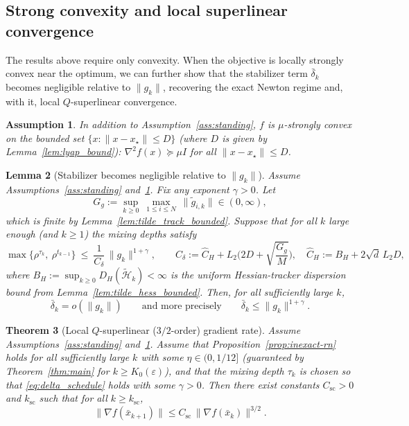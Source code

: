 \documentclass[11pt,a4paper]{article}
\newtheorem{theorem}{Theorem}[section]
\newtheorem{lemma}[theorem]{Lemma}
\newtheorem{assumption}[theorem]{Assumption}
\begin{document}
\subsection{Strong convexity and local superlinear convergence}
The results above require only convexity.
When the objective is locally strongly convex near the optimum,
we can further show that the stabilizer term $\bar\delta_k$ becomes
negligible relative to $\|g_k\|$, recovering the exact Newton
regime and, with it, local $Q$-superlinear convergence.

\begin{assumption}\label{ass:strong}
In addition to Assumption~\ref{ass:standing}, $f$ is $\mu$-strongly convex on the bounded set
$\{x:\|x-x_\star\|\le D\}$ (where $D$ is given by Lemma~\ref{lem:lyap_bound}):
$\nabla^2 f(x)\succeq \mu I$ for all $\|x-x_\star\|\le D$.
\end{assumption}

\begin{lemma}[Stabilizer becomes negligible relative to $\|g_k\|$]\label{lem:delta_o_g}
Assume Assumptions~\ref{ass:standing} and~\ref{ass:strong}.
Fix any exponent $\gamma>0$.
Let
\[
G_g:=\sup_{k\ge 0}\ \max_{1\le i\le N}\ \|\tilde g_{i,k}\|\in(0,\infty),
\]
which is finite by Lemma~\ref{lem:tilde_track_bounded}.
Suppose that for all $k$ large enough (and $k\ge 1$) the mixing depths satisfy
\begin{equation}\label{eq:delta_schedule}
\max\{\rho^{\tau_k},\ \rho^{t_{k-1}}\}\ \le\ \frac{1}{C_\delta}\,\|g_k\|^{1+\gamma},
\qquad
C_\delta:=\hat C_H+L_2\Big(2D+\sqrt{\frac{G_g}{M}}\Big),
\quad \hat C_H:=B_H+2\sqrt{d}\,L_2D,
\end{equation}
where $B_H:=\sup_{k\ge0}D_H(\tilde{\mathcal H}_k)<\infty$
is the uniform Hessian-tracker dispersion bound from Lemma~\ref{lem:tilde_hess_bounded}.
Then, for all sufficiently large $k$,
\[
\bar\delta_k = o(\|g_k\|)\qquad\text{and more precisely}\qquad \bar\delta_k\le \|g_k\|^{1+\gamma}.
\]
\end{lemma}

\begin{theorem}[Local $Q$-superlinear ($3/2$-order) gradient rate]\label{thm:superlinear}
Assume Assumptions~\ref{ass:standing} and~\ref{ass:strong}.
Assume that Proposition~\ref{prop:inexact-rn} holds for all sufficiently large $k$ with some $\eta\in(0,1/12]$
(guaranteed by Theorem~\ref{thm:main} for $k\ge K_0(\varepsilon)$),
and that the mixing depth $\tau_k$ is chosen so that \eqref{eq:delta_schedule} holds with some $\gamma>0$.
Then there exist constants $C_{\mathrm{sc}}>0$ and $k_{\mathrm{sc}}$ such that for all $k\ge k_{\mathrm{sc}}$,
\[
\|\nabla f(\bar x_{k+1})\|\le C_{\mathrm{sc}}\,\|\nabla f(\bar x_k)\|^{3/2}.
\]
\end{theorem}
\end{document}

